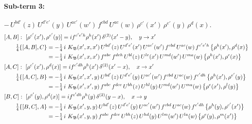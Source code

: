 \documentclass[10pt]{article}
\numberwithin{equation}{section}
\begin{document}
\paragraph{Sub-term 3:} $-\,U^{bd'}(z)\,U^{d'e'}(y)\,U^{ac'}(w')\,f^{cbd}\,U^{ac}(w)\,\rho^{c'}(x')\,\rho^{e'}(y)\,\rho^{d}(x)$.
\begin{align}
&[A,B]:\ [\rho^{c'}(x'),\rho^{e'}(y)]=i f^{c'e'h}\rho^{h}(x')\,\delta^{(2)}(x'-y),\quad y\to x'\notag\\
&\qquad \tfrac14\{[A,B],C\}=-\tfrac14\,i\,\,K_{\mathfrak B}(x',x,x')\,U^{bd'}(z)\,U^{d'e'}(x')\,U^{ac'}(w')\,f^{cbd}\,U^{ac}(w)\,f^{c'e'h}\,\big\{\rho^{h}(x'),\rho^{d}(x)\big\}\notag\\
&\qquad\phantom{\tfrac14\{[A,B],C\}}=-\tfrac14\,i\,\,K_{\mathfrak B}(x',x,x')\,f^{abc}\,f^{deh}\,U^{bl}(z)\,U^{le}(x')\,U^{md}(w')\,U^{ma}(w)\,\big\{\rho^{h}(x'),\rho^{c}(x)\big\}
\label{eq:GIII.I-3-AB}\\
&[A,C]:\ [\rho^{c'}(x'),\rho^{d}(x)]=i f^{c'dh}\rho^{h}(x')\,\delta^{(2)}(x'-x),\quad x\to x'\notag\\
&\qquad \tfrac14\{[A,C],B\}=-\tfrac14\,i\,\,K_{\mathfrak B}(x',x',y)\,U^{bd'}(z)\,U^{d'e'}(y)\,U^{ac'}(w')\,f^{cbd}\,U^{ac}(w)\,f^{c'dh}\,\big\{\rho^{h}(x'),\rho^{e'}(y)\big\}\notag\\
&\qquad\phantom{\tfrac14\{[A,C],B\}}=-\tfrac14\,i\,\,K_{\mathfrak B}(x',x',y)\,f^{abc}\,f^{dce}\,U^{bh}(z)\,U^{hl}(y)\,U^{md}(w')\,U^{ma}(w)\,\big\{\rho^{e}(x'),\rho^{l}(y)\big\}
\label{eq:GIII.I-3-AC}\\
&[B,C]:\ [\rho^{e'}(y),\rho^{d}(x)]=i f^{e'dh}\rho^{h}(y)\,\delta^{(2)}(y-x),\quad x\to y\notag\\
&\qquad \tfrac14\{[B,C],A\}=-\tfrac14\,i\,\,K_{\mathfrak B}(x',y,y)\,U^{bd'}(z)\,U^{d'e'}(y)\,U^{ac'}(w')\,f^{cbd}\,U^{ac}(w)\,f^{e'dh}\,\big\{\rho^{h}(y),\rho^{c'}(x')\big\}\notag\\
&\qquad\phantom{\tfrac14\{[B,C],A\}}=-\tfrac14\,i\,\,K_{\mathfrak B}(x',y,y)\,f^{abc}\,f^{dce}\,U^{bh}(z)\,U^{hd}(y)\,U^{lm}(w')\,U^{la}(w)\,\big\{\rho^{e}(y),\rho^{m}(x')\big\}
\label{eq:GIII.I-3-BC}
\end{align}
\end{document}
